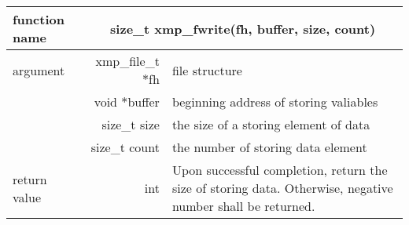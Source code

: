    \begin{table}[h]
    \begin{center}
     \begin{tabular}{|l|r|p{80mm}|}
      \hline
      {\bf function name}  & \multicolumn{2}{c|}{\bf size\_t
      xmp\_fwrite(fh, buffer, size, count)} \\ \hline \hline
      argument & xmp\_file\_t $*$fh & file structure \\ \cline{2-3}
      & void $*$buffer & beginning address of storing valiables \\ \cline{2-3}
      & size\_t size & the size of a storing element of data \\ \cline{2-3}
      & size\_t count & the number of storing data element \\ \hline
      return value & int & Upon successful completion, return the size
	      of storing data. Otherwise, negative number shall be
	      returned. \\ \hline
      \end{tabular}
     \end{center}
    \label{tb:aaa}
   \end{table}

   
